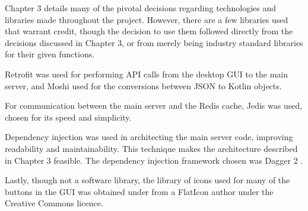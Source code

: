 Chapter 3 details many of the pivotal decisions regarding technologies and libraries made throughout the project. However, there are a few libraries used that warrant credit, though the decision to use them followed directly from the decisions discussed in Chapter 3, or from merely being industry standard libraries for their given functions.

Retrofit \cite{retrofit} was used for performing API calls from the desktop GUI to the main server, and Moshi \cite{moshi} used for the conversions between JSON to Kotlin objects.

For communication between the main server and the Redis cache, Jedis \cite{jedis} was used, chosen for its speed and simplicity.

Dependency injection was used in architecting the main server code, improving readability and maintainability. This technique makes the architecture described in Chapter 3 feasible. The dependency injection framework chosen was Dagger 2 \cite{dagger2}.

Lastly, though not a software library, the library of icons used for many of the buttons in the GUI was obtained under from a FlatIcon author \cite{flaticon} under the Creative Commons licence.

